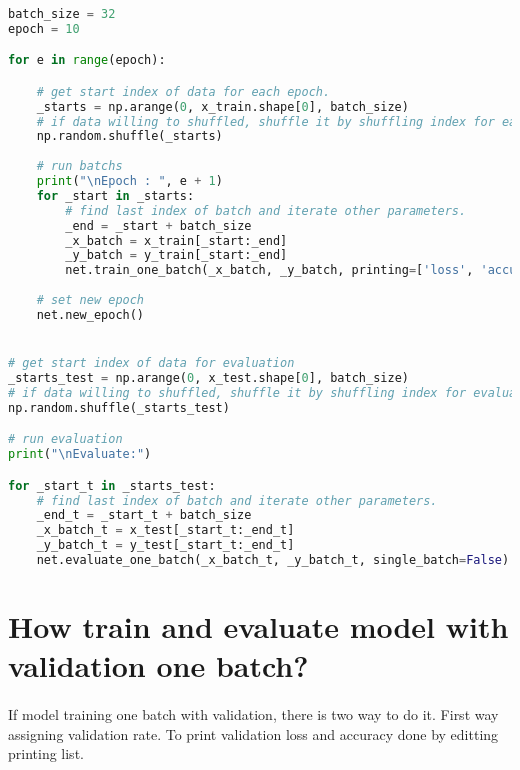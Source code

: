 \documentclass[12pt]{report}
\begin{document}
\begin{lstlisting}[language=Python, numbers=none, caption={Train and evaluate model on batch.}, label={ex:train-batch}]
    
batch_size = 32
epoch = 10

for e in range(epoch):

	# get start index of data for each epoch.
	_starts = np.arange(0, x_train.shape[0], batch_size)
	# if data willing to shuffled, shuffle it by shuffling index for each epoch.
	np.random.shuffle(_starts)
	
	# run batchs 
	print("\nEpoch : ", e + 1)
	for _start in _starts:
		# find last index of batch and iterate other parameters.
		_end = _start + batch_size                
		_x_batch = x_train[_start:_end]
		_y_batch = y_train[_start:_end]
		net.train_one_batch(_x_batch, _y_batch, printing=['loss', 'accuracy'], single_batch=False)
	
	# set new epoch 
	net.new_epoch()


# get start index of data for evaluation
_starts_test = np.arange(0, x_test.shape[0], batch_size)
# if data willing to shuffled, shuffle it by shuffling index for evaluation
np.random.shuffle(_starts_test)

# run evaluation
print("\nEvaluate:")

for _start_t in _starts_test:
	# find last index of batch and iterate other parameters.
	_end_t = _start_t + batch_size                
	_x_batch_t = x_test[_start_t:_end_t]
	_y_batch_t = y_test[_start_t:_end_t]
	net.evaluate_one_batch(_x_batch_t, _y_batch_t, single_batch=False)

\end{lstlisting}




\section{How train and evaluate model with validation one batch?}
\paragraph{}
If model training one batch with validation, there is two way to do it. First way assigning validation rate. To print validation loss and accuracy done by editting printing list. 
\end{document}
